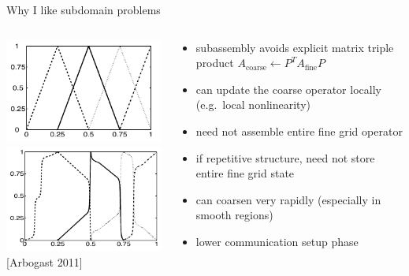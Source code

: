 \begin{frame}{Why I like subdomain problems}
  \begin{columns}
    \begin{column}{0.4\textwidth}
      \includegraphics[width=\textwidth]{figures/ArbogastCoarse} \\
      \includegraphics[width=\textwidth]{figures/ArbogastCoarseMs} \\
      {\small [Arbogast 2011]}
    \end{column}
    \begin{column}{0.6\textwidth}
      \begin{itemize}
      \item subassembly avoids explicit matrix triple product $A_{\text{coarse}} \gets P^T A_{\text{fine}} P$
      \item can update the coarse operator locally (e.g.~local nonlinearity)
      \item need not assemble entire fine grid operator
      \item if repetitive structure, need not store entire fine grid state
      \item can coarsen very rapidly (especially in smooth regions)
      \item lower communication setup phase
      \end{itemize}      
    \end{column}
  \end{columns}
\end{frame}
